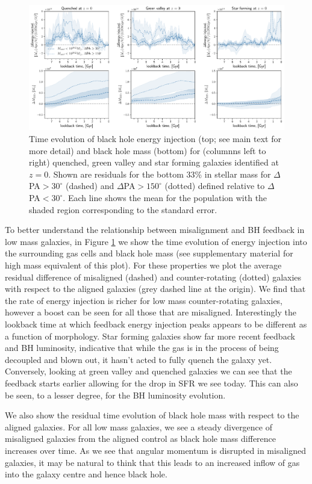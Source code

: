 \documentclass[fleqn,usenatbib]{mnras}
\begin{document}
\begin{figure}
	\includegraphics[width=0.9\linewidth]{overall_population/LM_BH_residual_evo_Mstel10_2.pdf}
    \caption{Time evolution of black hole energy injection (top; see main text for more detail) and black hole mass (bottom) for (columnns left to right) quenched, green valley and star forming galaxies identified at $z=0$. Shown are residuals for the bottom 33\% in stellar mass for $\Delta$PA$ > 30^{\circ}$ (dashed) and $\Delta$PA$ > 150^{\circ}$ (dotted) defined relative to $\Delta$PA$ < 30^{\circ}$. Each line shows the mean for the population with the shaded region corresponding to the standard error.}
    \label{fig:LM_BH}
\end{figure}

To better understand the relationship between misalignment and BH feedback in low mass galaxies, in Figure \ref{fig:LM_BH} we show the time evolution of energy injection into the surrounding gas cells and black hole mass (see supplementary material for high mass equivalent of this plot). For these properties we plot the average residual difference of misaligned (dashed) and counter-rotating (dotted) galaxies with respect to the aligned galaxies (grey dashed line at the origin). We find that the rate of energy injection is richer for low mass counter-rotating galaxies, however a boost can be seen for all those that are misaligned. Interestingly the lookback time at which feedback energy injection peaks appears to be different as a function of morphology. Star forming galaxies show far more recent feedback and BH luminosity, indicative that while the gas is in the process of being decoupled and blown out, it hasn't acted to fully quench the galaxy yet. Conversely, looking at green valley and quenched galaxies we can see that the feedback starts earlier allowing for the drop in SFR we see today. This can also be seen, to a lesser degree, for the BH luminosity evolution. 

We also show the residual time evolution of black hole mass with respect to the aligned galaxies. For all low mass galaxies, we see a steady divergence of misaligned galaxies from the aligned control as black hole mass difference increases over time. As we see that angular momentum is disrupted in misaligned galaxies, it may be natural to think that this leads to an increased inflow of gas into the galaxy centre and hence black hole.
\end{document}
